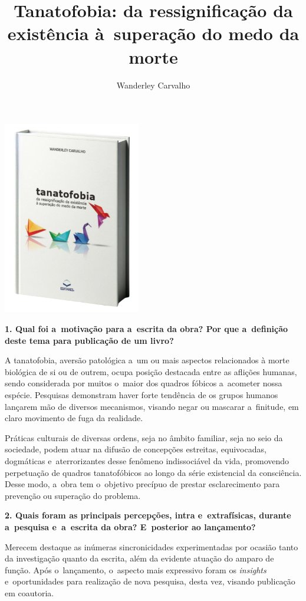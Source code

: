 \documentclass{gescons}
\author{Wanderley Carvalho}
\title{Tanatofobia: da ressignificação da existência à~superação do medo da morte}
\begin{document}
    \makeentrevistatitle

    \begin{multicols}{2}

\begin{center}
    \vspace{-0.5cm}
    \includegraphics[width=6cm]{articles/entrevista/mockups/Wanderley_Carvalho.png}
\end{center}


\textbf{1. Qual foi a~motivação para a~escrita da obra? Por que a~definição deste tema para publicação de um livro?}


A tanatofobia, aversão patológica a~um ou mais aspectos relacionados à
morte biológica de si ou de outrem, ocupa posição destacada entre as
aflições humanas, sendo considerada por muitos o~maior dos quadros
fóbicos a~acometer nossa espécie. Pesquisas demonstram haver forte
tendência de os grupos humanos lançarem mão de diversos mecanismos,
visando negar ou mascarar a~finitude, em claro movimento de fuga da
realidade.

Práticas culturais de diversas ordens, seja no âmbito familiar, seja no
seio da sociedade, podem atuar na difusão de concepções estreitas,
equivocadas, dogmáticas e~aterrorizantes desse fenômeno indissociável da
vida, promovendo perpetuação de quadros tanatofóbicos ao longo da série
existencial da consciência. Desse modo, a~obra tem o~objetivo precípuo
de prestar esclarecimento para prevenção ou superação do problema.

\textbf{2. Quais foram as principais percepções, intra e~extrafísicas, durante a~pesquisa e~a~escrita da obra? E~posterior ao lançamento?}

Merecem destaque as inúmeras sincronicidades experimentadas por ocasião
tanto da investigação quanto da escrita, além da evidente atuação do
amparo de função. Após o~lançamento, o~aspecto mais expressivo foram os
\emph{insights} e~oportunidades para realização de nova pesquisa, desta
vez, visando publicação em coautoria.


\end{multicols}
\end{document}
